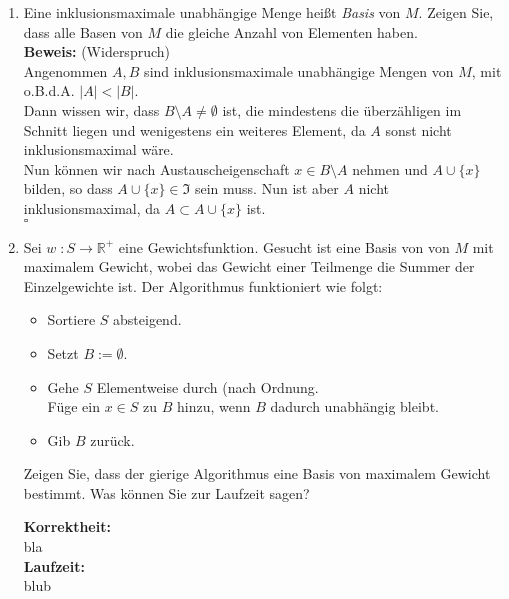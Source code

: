 \documentclass[11pt,a4paper,ngerman]{article}
\begin{document}
\begin{enumerate}[\bfseries (a)]

\item Eine inklusionsmaximale unabhängige Menge heißt \emph{Basis} von $M$. Zeigen Sie, dass alle Basen von $M$ die gleiche Anzahl von Elementen haben.\\

\textbf{Beweis:} (Widerspruch)\\
Angenommen $A,B$ sind inklusionsmaximale unabhängige Mengen von $M$, mit o.B.d.A. $|A| < |B|$.\\
Dann wissen wir, dass $B \setminus A \not= \emptyset$ ist, die mindestens die überzähligen im Schnitt liegen und wenigestens ein weiteres Element, da $A$ sonst nicht inklusionsmaximal wäre.\\

Nun können wir nach Austauscheigenschaft $x \in B \setminus A$ nehmen und $A \cup \{x \}$ bilden, so dass $A \cup \{ x \} \in \mathfrak{I}$ sein muss. Nun ist aber $A$ nicht inklusionsmaximal, da $A \subset A \cup \{x \}$ ist.\\
\mbox{} \hfill $\square$

\item Sei $w \; : S \longrightarrow \mathbb{R}^+$ eine Gewichtsfunktion. Gesucht ist eine Basis von von $M$ mit maximalem Gewicht, wobei das Gewicht einer Teilmenge die Summer der Einzelgewichte ist. Der Algorithmus funktioniert wie folgt:\\

\begin{itemize}

\item Sortiere $S$ absteigend.

\item Setzt $B := \emptyset$.

\item Gehe $S$ Elementweise durch (nach Ordnung.\\
Füge ein $x \in S$ zu $B$ hinzu, wenn $B$ dadurch unabhängig bleibt.

\item Gib $B$ zurück.

\end{itemize}

Zeigen Sie, dass der gierige Algorithmus eine Basis von maximalem Gewicht bestimmt. Was können Sie zur Laufzeit sagen?

\textbf{Korrektheit:}\\

bla\\

\textbf{Laufzeit:}\\

blub

\end{enumerate}

\label{LastPage}
\end{document}
